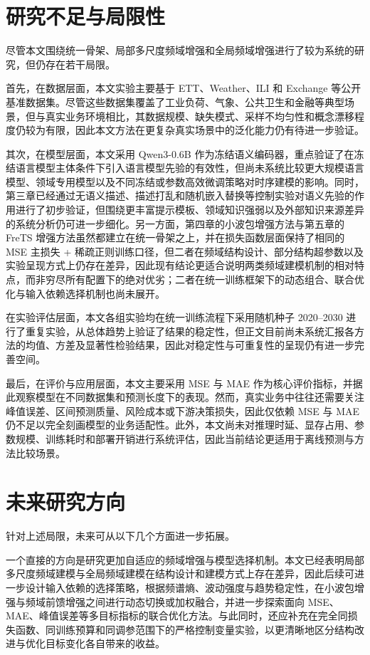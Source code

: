 \section{研究不足与局限性}
尽管本文围绕统一骨架、局部多尺度频域增强和全局频域增强进行了较为系统的研究，但仍存在若干局限。

首先，在数据层面，本文实验主要基于 ETT、Weather、ILI 和 Exchange 等公开基准数据集。尽管这些数据集覆盖了工业负荷、气象、公共卫生和金融等典型场景，但与真实业务环境相比，其数据规模、缺失模式、采样不均匀性和概念漂移程度仍较为有限，因此本文方法在更复杂真实场景中的泛化能力仍有待进一步验证。

其次，在模型层面，本文采用 Qwen3-0.6B 作为冻结语义编码器，重点验证了在冻结语言模型主体条件下引入语言模型先验的有效性，但尚未系统比较更大规模语言模型、领域专用模型以及不同冻结或参数高效微调策略对时序建模的影响。同时，第三章已经通过无语义描述、描述打乱和随机嵌入替换等控制实验对语义先验的作用进行了初步验证，但围绕更丰富提示模板、领域知识强弱以及外部知识来源差异的系统分析仍可进一步细化。另一方面，第四章的小波包增强方法与第五章的 FreTS 增强方法虽然都建立在统一骨架之上，并在损失函数层面保持了相同的 MSE 主损失 + 稀疏正则训练口径，但二者在频域结构设计、部分结构超参数以及实验呈现方式上仍存在差异，因此现有结论更适合说明两类频域建模机制的相对特点，而非穷尽所有配置下的绝对优劣；二者在统一训练框架下的动态组合、联合优化与输入依赖选择机制也尚未展开。

在实验评估层面，本文各组实验均在统一训练流程下采用随机种子 2020--2030 进行了重复实验，从总体趋势上验证了结果的稳定性，但正文目前尚未系统汇报各方法的均值、方差及显著性检验结果，因此对稳定性与可重复性的呈现仍有进一步完善空间。

最后，在评价与应用层面，本文主要采用 MSE 与 MAE 作为核心评价指标，并据此观察模型在不同数据集和预测长度下的表现。然而，真实业务中往往还需要关注峰值误差、区间预测质量、风险成本或下游决策损失，因此仅依赖 MSE 与 MAE 仍不足以完全刻画模型的业务适配性。此外，本文尚未对推理时延、显存占用、参数规模、训练耗时和部署开销进行系统评估，因此当前结论更适用于离线预测与方法比较场景。

\section{未来研究方向}
针对上述局限，未来可从以下几个方面进一步拓展。

一个直接的方向是研究更加自适应的频域增强与模型选择机制。本文已经表明局部多尺度频域建模与全局频域建模在结构设计和建模方式上存在差异，因此后续可进一步设计输入依赖的选择策略，根据频谱熵、波动强度与趋势稳定性，在小波包增强与频域前馈增强之间进行动态切换或加权融合，并进一步探索面向 MSE、MAE、峰值误差等多目标指标的联合优化方法。与此同时，还应补充在完全同损失函数、同训练预算和同调参范围下的严格控制变量实验，以更清晰地区分结构改进与优化目标变化各自带来的收益。

